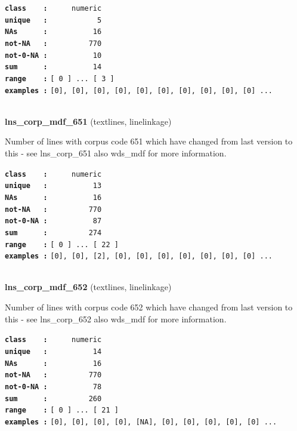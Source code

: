 \documentclass[]{article}
\begin{document}
\textbf{\texttt{class\ \ \ \ :}} \texttt{~~~~~numeric}\\
\textbf{\texttt{unique\ \ \ :}} \texttt{~~~~~~~~~~~5}\\
\textbf{\texttt{NAs\ \ \ \ \ \ :}} \texttt{~~~~~~~~~~16}\\
\textbf{\texttt{not-NA\ \ \ :}} \texttt{~~~~~~~~~770}\\
\textbf{\texttt{not-0-NA\ :}} \texttt{~~~~~~~~~~10}\\
\textbf{\texttt{sum\ \ \ \ \ \ :}} \texttt{~~~~~~~~~~14}\\
\textbf{\texttt{range\ \ \ \ :}}
\texttt{{[}\ 0\ {]}\ ...\ {[}\ 3\ {]}}\\
\textbf{\texttt{examples\ :}}
\texttt{{[}0{]},\ {[}0{]},\ {[}0{]},\ {[}0{]},\ {[}0{]},\ {[}0{]},\ {[}0{]},\ {[}0{]},\ {[}0{]},\ {[}0{]}\ ...}\\

~

\textbf{lns\_corp\_mdf\_651} (textlines, linelinkage)

Number of lines with corpus code 651 which have changed from last
version to this - see lns\_corp\_651 also wds\_mdf for more information.

\textbf{\texttt{class\ \ \ \ :}} \texttt{~~~~~numeric}\\
\textbf{\texttt{unique\ \ \ :}} \texttt{~~~~~~~~~~13}\\
\textbf{\texttt{NAs\ \ \ \ \ \ :}} \texttt{~~~~~~~~~~16}\\
\textbf{\texttt{not-NA\ \ \ :}} \texttt{~~~~~~~~~770}\\
\textbf{\texttt{not-0-NA\ :}} \texttt{~~~~~~~~~~87}\\
\textbf{\texttt{sum\ \ \ \ \ \ :}} \texttt{~~~~~~~~~274}\\
\textbf{\texttt{range\ \ \ \ :}}
\texttt{{[}\ 0\ {]}\ ...\ {[}\ 22\ {]}}\\
\textbf{\texttt{examples\ :}}
\texttt{{[}0{]},\ {[}0{]},\ {[}2{]},\ {[}0{]},\ {[}0{]},\ {[}0{]},\ {[}0{]},\ {[}0{]},\ {[}0{]},\ {[}0{]}\ ...}\\

~

\textbf{lns\_corp\_mdf\_652} (textlines, linelinkage)

Number of lines with corpus code 652 which have changed from last
version to this - see lns\_corp\_652 also wds\_mdf for more information.

\textbf{\texttt{class\ \ \ \ :}} \texttt{~~~~~numeric}\\
\textbf{\texttt{unique\ \ \ :}} \texttt{~~~~~~~~~~14}\\
\textbf{\texttt{NAs\ \ \ \ \ \ :}} \texttt{~~~~~~~~~~16}\\
\textbf{\texttt{not-NA\ \ \ :}} \texttt{~~~~~~~~~770}\\
\textbf{\texttt{not-0-NA\ :}} \texttt{~~~~~~~~~~78}\\
\textbf{\texttt{sum\ \ \ \ \ \ :}} \texttt{~~~~~~~~~260}\\
\textbf{\texttt{range\ \ \ \ :}}
\texttt{{[}\ 0\ {]}\ ...\ {[}\ 21\ {]}}\\
\textbf{\texttt{examples\ :}}
\texttt{{[}0{]},\ {[}0{]},\ {[}0{]},\ {[}0{]},\ {[}NA{]},\ {[}0{]},\ {[}0{]},\ {[}0{]},\ {[}0{]},\ {[}0{]}\ ...}\\
\end{document}
